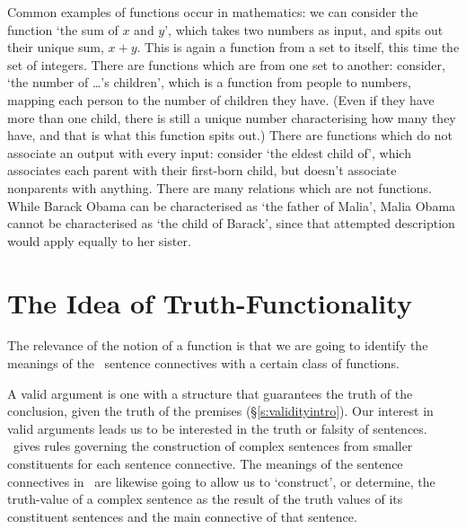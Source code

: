 Common examples of functions occur in mathematics: we can consider the function `the sum of $x$ and $y$', which takes two numbers as input, and spits out their unique sum, $x+y$. This is again a function from a set to itself, this time the set of integers. There are functions which are from one set to another: consider, `the number of …'s children', which is a function from people to numbers, mapping each person to the number of children they have. (Even if they have more than one child, there is still a unique number characterising how many they have, and that is what this function spits out.) There are functions which do not associate an output with every input: consider `the eldest child of', which associates each parent with their first-born child, but doesn't associate nonparents with anything. There are many relations which are not functions. While Barack Obama can be characterised as `the father of Malia', Malia Obama cannot be characterised as `the child of Barack', since that attempted description would apply equally to her sister.  

\section{The Idea of Truth-Functionality}

The relevance of the notion of a function is that we are going to identify the meanings of the \TFL\ sentence connectives with a certain class of functions.

A valid argument is one with a structure that guarantees the truth of the conclusion, given the truth of the premises (§\ref{s:validityintro}). Our interest in valid arguments leads us to be interested in the truth or falsity of sentences. \TFL\ gives rules governing the construction of complex sentences from smaller constituents for each sentence connective. The meanings of the sentence connectives in \TFL\ are likewise going to allow us to `construct', or determine, the truth-value of a complex sentence as the result of the truth values of its constituent sentences and the main connective of that sentence. 

